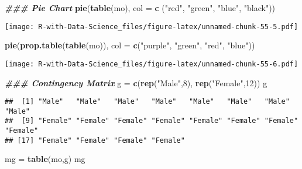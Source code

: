 \documentclass[
]{article}
\newenvironment{Shaded}{\begin{snugshade}}{\end{snugshade}}
\newcommand{\AttributeTok}[1]{\textcolor[rgb]{0.13,0.29,0.53}{#1}}
\newcommand{\DecValTok}[1]{\textcolor[rgb]{0.00,0.00,0.81}{#1}}
\newcommand{\DocumentationTok}[1]{\textcolor[rgb]{0.56,0.35,0.01}{\textbf{\textit{#1}}}}
\newcommand{\FunctionTok}[1]{\textcolor[rgb]{0.13,0.29,0.53}{\textbf{#1}}}
\newcommand{\NormalTok}[1]{#1}
\newcommand{\OtherTok}[1]{\textcolor[rgb]{0.56,0.35,0.01}{#1}}
\newcommand{\StringTok}[1]{\textcolor[rgb]{0.31,0.60,0.02}{#1}}
\begin{document}
\begin{Shaded}
\begin{Highlighting}[]
\DocumentationTok{\#\#\# Pie Chart}
\FunctionTok{pie}\NormalTok{(}\FunctionTok{table}\NormalTok{(mo), }\AttributeTok{col =} \FunctionTok{c}\NormalTok{ (}\StringTok{"red"}\NormalTok{, }\StringTok{"green"}\NormalTok{, }\StringTok{"blue"}\NormalTok{, }\StringTok{"black"}\NormalTok{))}
\end{Highlighting}
\end{Shaded}

\texttt{[image: R-with-Data-Science\_files/figure-latex/unnamed-chunk-55-5.pdf]}

\begin{Shaded}
\begin{Highlighting}[]
\FunctionTok{pie}\NormalTok{(}\FunctionTok{prop.table}\NormalTok{(}\FunctionTok{table}\NormalTok{(mo)), }\AttributeTok{col =} \FunctionTok{c}\NormalTok{(}\StringTok{"purple"}\NormalTok{, }\StringTok{"green"}\NormalTok{, }\StringTok{"red"}\NormalTok{, }\StringTok{"blue"}\NormalTok{))}
\end{Highlighting}
\end{Shaded}

\texttt{[image: R-with-Data-Science\_files/figure-latex/unnamed-chunk-55-6.pdf]}

\begin{Shaded}
\begin{Highlighting}[]
\DocumentationTok{\#\#\# Contingency Matrix}
\NormalTok{g }\OtherTok{=} \FunctionTok{c}\NormalTok{(}\FunctionTok{rep}\NormalTok{(}\StringTok{"Male"}\NormalTok{,}\DecValTok{8}\NormalTok{), }\FunctionTok{rep}\NormalTok{(}\StringTok{"Female"}\NormalTok{,}\DecValTok{12}\NormalTok{))}
\NormalTok{g}
\end{Highlighting}
\end{Shaded}

\begin{verbatim}
##  [1] "Male"   "Male"   "Male"   "Male"   "Male"   "Male"   "Male"   "Male"  
##  [9] "Female" "Female" "Female" "Female" "Female" "Female" "Female" "Female"
## [17] "Female" "Female" "Female" "Female"
\end{verbatim}

\begin{Shaded}
\begin{Highlighting}[]
\NormalTok{mg }\OtherTok{=} \FunctionTok{table}\NormalTok{(mo,g)}
\NormalTok{mg}
\end{Highlighting}
\end{Shaded}
\end{document}
